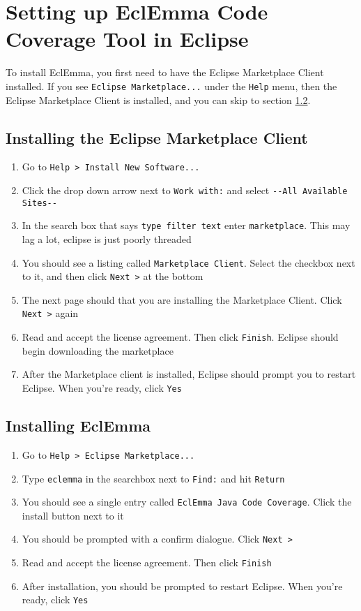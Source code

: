 \documentclass[11pt]{article}
\begin{document}
\section{Setting up EclEmma Code Coverage Tool in Eclipse}

To install EclEmma, you first need to have the Eclipse Marketplace Client
installed. If you see \verb|Eclipse Marketplace...| under the \verb|Help| menu,
then the Eclipse Marketplace Client is installed, and you can skip to section
\ref{ssec:eclemma}.

\subsection{Installing the Eclipse Marketplace Client}

\begin{enumerate}
\item Go to \verb|Help > Install New Software...|
\item Click the drop down arrow next to \verb|Work with:| and select
  \verb|--All Available Sites--|
\item In the search box that says \verb|type filter text| enter
  \verb|marketplace|. This may lag a lot, eclipse is just poorly threaded
\item You should see a listing called \verb|Marketplace Client|. Select the
  checkbox next to it, and then click \verb|Next >| at the bottom
\item The next page should that you are installing the Marketplace
  Client. Click \verb|Next >| again
\item Read and accept the license agreement. Then click \verb|Finish|. Eclipse
  should begin downloading the marketplace
\item After the Marketplace client is installed, Eclipse should prompt you to
  restart Eclipse. When you're ready, click \verb|Yes|
\end{enumerate}

\subsection{Installing EclEmma}\label{ssec:eclemma}

\begin{enumerate}
\item Go to \verb|Help > Eclipse Marketplace...|
\item Type \verb|eclemma| in the searchbox next to \verb|Find:| and hit
  \verb|Return|
\item You should see a single entry called \verb|EclEmma Java Code Coverage|.
  Click the install button next to it
\item You should be prompted with a confirm dialogue. Click \verb|Next >|
\item Read and accept the license agreement. Then click \verb|Finish|
\item After installation, you should be prompted to restart Eclipse. When
  you're ready, click \verb|Yes|
\end{enumerate}
\end{document}
